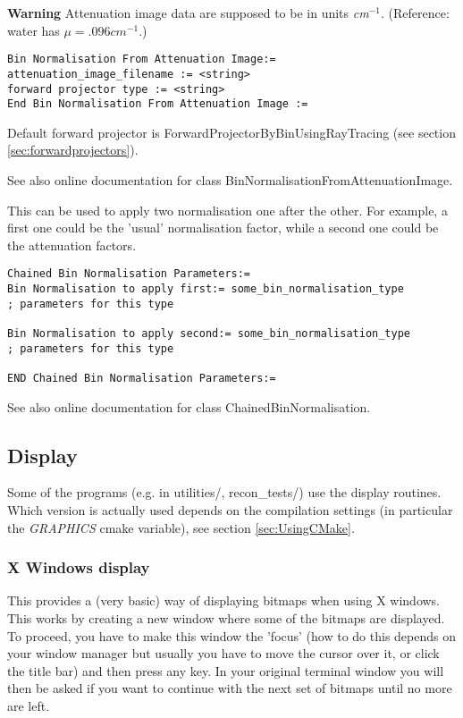 \documentclass{article}
\begin{document}
\textbf{Warning} Attenuation image data are supposed to be in units \textit{cm}$^{-1}$. 
(Reference: water has $\mu=.096 \mathit{cm}^{-1}$.)

{ 
}
\begin{verbatim}
Bin Normalisation From Attenuation Image:=
attenuation_image_filename := <string>
forward projector type := <string>
End Bin Normalisation From Attenuation Image :=
\end{verbatim}


Default forward projector is ForwardProjectorByBinUsingRayTracing 
(see section \ref{sec:forwardprojectors}).


See also online documentation for class BinNormalisationFromAttenuationImage.

{ 
}
\label{sec:chainedbinnormalisation}
This can be used to apply two normalisation one after the other. 
For example, a first one could be the 'usual' normalisation factor, 
while a second one could be the attenuation factors.

{ 
}
\begin{verbatim}
Chained Bin Normalisation Parameters:=
Bin Normalisation to apply first:= some_bin_normalisation_type
; parameters for this type

Bin Normalisation to apply second:= some_bin_normalisation_type
; parameters for this type

END Chained Bin Normalisation Parameters:=
\end{verbatim}

See also online documentation for class ChainedBinNormalisation.



\subsection{
Display}

Some of the programs (e.g. in utilities/, recon\_tests/) use 
the display routines. Which version is actually used depends 
on the compilation settings (in particular the \textit{GRAPHICS} cmake 
variable), see section \ref{sec:UsingCMake}. 


\subsubsection{
X Windows display}
\label{sec:display}
This provides a (very basic) way of displaying bitmaps when using 
X windows. This works by creating a new window where some of 
the bitmaps are displayed. To proceed, you have to make this 
window the 'focus' (how to do this depends on your window manager 
but usually you have to move the cursor over it, or click the 
title bar) and then press any key. In your original terminal 
window you will then be asked if you want to continue with the 
next set of bitmaps until no more are left.
\end{document}
